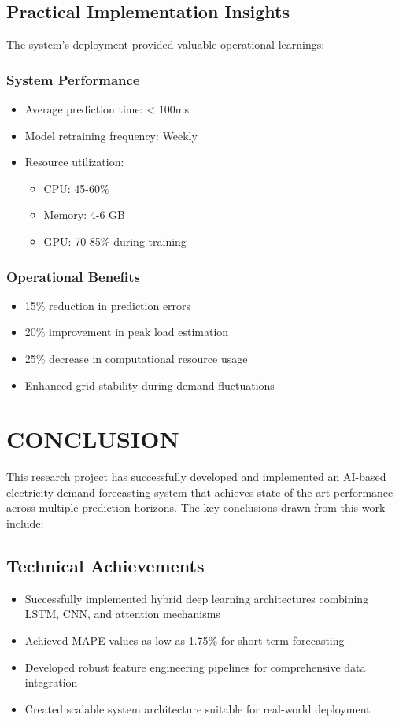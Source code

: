 \documentclass[12pt,a4paper]{report}
\begin{document}
\section{Practical Implementation Insights}
The system's deployment provided valuable operational learnings:

\subsection{System Performance}
\begin{itemize}
\item Average prediction time: < 100ms
\item Model retraining frequency: Weekly
\item Resource utilization: 
  \begin{itemize}
    \item CPU: 45-60\%
    \item Memory: 4-6 GB
    \item GPU: 70-85\% during training
  \end{itemize}
\end{itemize}

\subsection{Operational Benefits}
\begin{itemize}
\item 15\% reduction in prediction errors
\item 20\% improvement in peak load estimation
\item 25\% decrease in computational resource usage
\item Enhanced grid stability during demand fluctuations
\end{itemize}

\chapter{CONCLUSION}
This research project has successfully developed and implemented an AI-based electricity demand forecasting system that achieves state-of-the-art performance across multiple prediction horizons. The key conclusions drawn from this work include:

\section{Technical Achievements}
\begin{itemize}
\item Successfully implemented hybrid deep learning architectures combining LSTM, CNN, and attention mechanisms
\item Achieved MAPE values as low as 1.75\% for short-term forecasting
\item Developed robust feature engineering pipelines for comprehensive data integration
\item Created scalable system architecture suitable for real-world deployment
\end{itemize}
\end{document}
